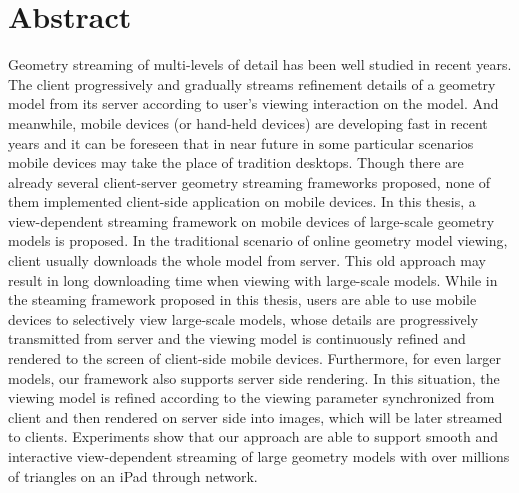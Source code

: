 \chapter*{Abstract}
\label{chapter:abstract}
Geometry streaming of multi-levels of detail has been well studied in recent years. The client progressively and gradually streams refinement details of a geometry model from its server according to user's viewing interaction on the model. And meanwhile, mobile devices (or hand-held devices) are developing fast in recent years and it can be foreseen that in near future in some particular scenarios mobile devices may take the place of tradition desktops. Though there are already several client-server geometry streaming frameworks proposed, none of them implemented client-side application on mobile devices. In this thesis, a view-dependent streaming framework on mobile devices of large-scale geometry models is proposed. In the traditional scenario of online geometry model viewing, client usually downloads the whole model from server. This old approach may result in long downloading time when viewing with large-scale models. While in the steaming framework proposed in this thesis, users are able to use mobile devices to selectively view large-scale models, whose details are progressively transmitted from server and the viewing model is continuously refined and rendered to the screen of client-side mobile devices. Furthermore, for even larger models, our framework also supports server side rendering. In this situation, the viewing model is refined according to the viewing parameter synchronized from client and then rendered on server side into images, which will be later streamed to clients. Experiments show that our approach are able to support smooth and interactive view-dependent streaming of large geometry models with over millions of triangles on an iPad through network. 

